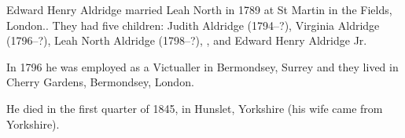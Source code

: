 
Edward Henry Aldridge married Leah North  in 1789 at St Martin in the Fields, London.\cite{EHAldridgeMarriage}. They had five children: Judith Aldridge (1794--?), Virginia Aldridge (1796--?), Leah North Aldridge (1798--?), , and Edward Henry Aldridge Jr.

In 1796 he was employed as a Victualler in Bermondsey, Surrey and they lived in Cherry Gardens, Bermondsey, London. \cite{EHAldridgeWork}

He died in the first quarter of 1845, in Hunslet, Yorkshire (his wife came from Yorkshire).\cite{EHAldridgeDeath}
